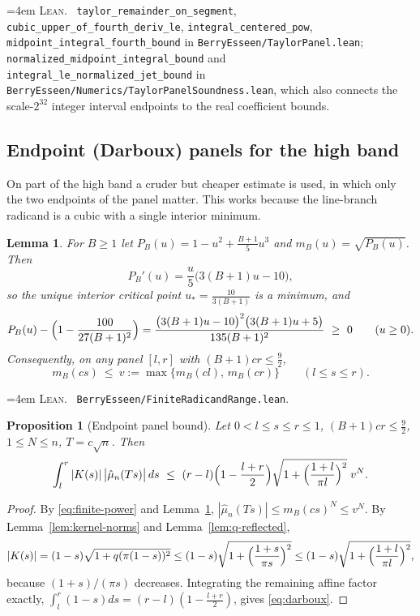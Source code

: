 \documentclass[10pt,a4paper]{article}
\theoremstyle{plain}
\newtheorem{proposition}[theorem]{Proposition}
\newtheorem{lemma}[theorem]{Lemma}
\theoremstyle{definition}
\newcommand{\lean}[1]{\texttt{#1}}
\newcommand{\file}[1]{\texttt{#1}}
\newenvironment{leanref}%
  {\par\addvspace{3pt}\begingroup\sloppy\emergencystretch=4em
   \noindent\footnotesize\textsc{Lean.}\ \ignorespaces}%
  {\par\endgroup\addvspace{3pt}}
\begin{document}
\begin{leanref}
\lean{taylor\_remainder\_on\_segment}, \lean{cubic\_upper\_of\_fourth\_deriv\_le},
\lean{integral\_centered\_pow}, \lean{midpoint\_integral\_fourth\_bound} in
\file{BerryEsseen/TaylorPanel.lean};
\lean{normalized\_midpoint\_integral\_bound} and
\lean{integral\_le\_normalized\_jet\_bound} in
\file{BerryEsseen/Numerics/TaylorPanelSoundness.lean}, which also connects the
scale-$2^{32}$ integer interval endpoints to the real coefficient bounds.
\end{leanref}

\subsection{Endpoint (Darboux) panels for the high band}
\label{sec:darboux}

On part of the high band a cruder but cheaper estimate is used, in which only
the two endpoints of the panel matter. This works because the line-branch
radicand is a cubic with a single interior minimum.

\begin{lemma}\label{lem:radicand-range}
For $B\ge1$ let $P_B(u)=1-u^2+\tfrac{B+1}{5}u^3$ and
$m_B(u)=\sqrt{P_B(u)}$. Then
\[
  P_B'(u) = \frac u5\bigl(3(B+1)u-10\bigr),
\]
so the unique interior critical point $u_*=\tfrac{10}{3(B+1)}$ is a minimum, and
\[
  P_B(u) - \Bigl(1-\frac{100}{27(B+1)^2}\Bigr)
  = \frac{\bigl(3(B+1)u-10\bigr)^2\bigl(3(B+1)u+5\bigr)}{135(B+1)^2}
  \ \ge\ 0 \qquad (u\ge0).
\]
Consequently, on any panel $[l,r]$ with $(B+1)cr\le\tfrac92$,
\[
  m_B(cs) \ \le\ v := \max\{m_B(cl),\,m_B(cr)\} \qquad (l\le s\le r).
\]
\end{lemma}

\begin{leanref}
\file{BerryEsseen/FiniteRadicandRange.lean}.
\end{leanref}

\begin{proposition}[Endpoint panel bound]\label{prop:darboux}
Let $0<l\le s\le r\le1$, $(B+1)cr\le\tfrac92$, $1\le N\le n$, $T=c\sqrt n$.
Then
\begin{equation}\label{eq:darboux}
  \int_l^r |K(s)|\,\bigl|\hat\mu_n(Ts)\bigr|\,ds
  \ \le\ (r-l)\Bigl(1-\frac{l+r}{2}\Bigr)
    \sqrt{1+\Bigl(\frac{1+l}{\pi l}\Bigr)^2}\;v^N .
\end{equation}
\end{proposition}

\begin{proof}
By \eqref{eq:finite-power} and Lemma~\ref{lem:radicand-range},
$|\hat\mu_n(Ts)|\le m_B(cs)^N\le v^N$. By Lemma~\ref{lem:kernel-norms} and
Lemma~\ref{lem:q-reflected},
\[
  |K(s)| = (1-s)\sqrt{1+q(\pi(1-s))^2}
  \le (1-s)\sqrt{1+\Bigl(\frac{1+s}{\pi s}\Bigr)^2}
  \le (1-s)\sqrt{1+\Bigl(\frac{1+l}{\pi l}\Bigr)^2},
\]
because $(1+s)/(\pi s)$ decreases. Integrating the remaining affine factor
exactly, $\int_l^r(1-s)ds=(r-l)(1-\tfrac{l+r}{2})$, gives
\eqref{eq:darboux}.
\end{proof}
\end{document}
